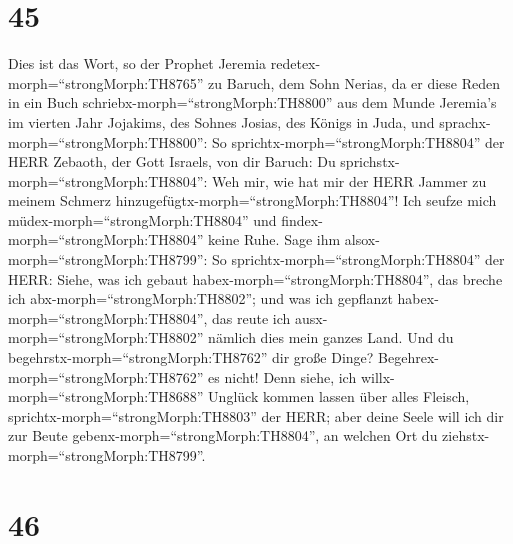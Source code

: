 \hypertarget{section-44}{%
\section{45}\label{section-44}}

 Dies ist das Wort, so der Prophet Jeremia
redetex-morph=``strongMorph:TH8765'' zu Baruch, dem Sohn Nerias, da er
diese Reden in ein Buch schriebx-morph=``strongMorph:TH8800'' aus dem
Munde Jeremia's im vierten Jahr Jojakims, des Sohnes Josias, des Königs
in Juda, und sprachx-morph=``strongMorph:TH8800'':  So
sprichtx-morph=``strongMorph:TH8804'' der HERR Zebaoth, der Gott
Israels, von dir Baruch:  Du
sprichstx-morph=``strongMorph:TH8804'': Weh mir, wie hat mir der HERR
Jammer zu meinem Schmerz hinzugefügtx-morph=``strongMorph:TH8804''! Ich
seufze mich müdex-morph=``strongMorph:TH8804'' und
findex-morph=``strongMorph:TH8804'' keine Ruhe.  Sage ihm
alsox-morph=``strongMorph:TH8799'': So
sprichtx-morph=``strongMorph:TH8804'' der HERR: Siehe, was ich gebaut
habex-morph=``strongMorph:TH8804'', das breche ich
abx-morph=``strongMorph:TH8802''; und was ich gepflanzt
habex-morph=``strongMorph:TH8804'', das reute ich
ausx-morph=``strongMorph:TH8802'' nämlich dies mein ganzes Land.
 Und du begehrstx-morph=``strongMorph:TH8762'' dir große
Dinge? Begehrex-morph=``strongMorph:TH8762'' es nicht! Denn siehe, ich
willx-morph=``strongMorph:TH8688'' Unglück kommen lassen über alles
Fleisch, sprichtx-morph=``strongMorph:TH8803'' der HERR; aber deine
Seele will ich dir zur Beute gebenx-morph=``strongMorph:TH8804'', an
welchen Ort du ziehstx-morph=``strongMorph:TH8799''.

\hypertarget{section-45}{%
\section{46}\label{section-45}}

